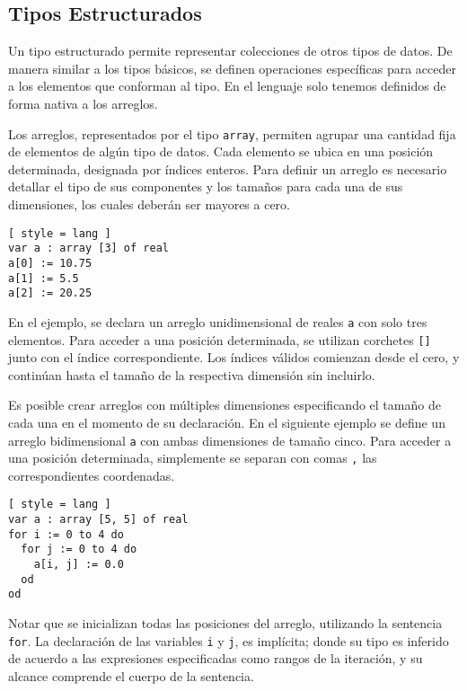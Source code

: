 \subsection{Tipos Estructurados}

Un tipo estructurado permite representar colecciones de otros tipos de datos.
De manera similar a los tipos básicos, se definen operaciones específicas para acceder a los elementos que conforman al tipo.
En el lenguaje solo tenemos definidos de forma nativa a los arreglos.

Los arreglos, representados por el tipo \lstinline[style = lang]{array}, permiten agrupar una cantidad fija de elementos de algún tipo de datos.
Cada elemento se ubica en una posición determinada, designada por índices enteros.
Para definir un arreglo es necesario detallar el tipo de sus componentes y los tamaños para cada una de sus dimensiones, los cuales deberán ser mayores a cero.

\begin{lstlisting}[ style = lang ]
var a : array [3] of real
a[0] := 10.75
a[1] := 5.5
a[2] := 20.25
\end{lstlisting}

En el ejemplo, se declara un arreglo unidimensional de reales \lstinline[style = lang]{a} con solo tres elementos.
Para acceder a una posición determinada, se utilizan corchetes \lstinline[style = lang]{[]} junto con el índice correspondiente.
Los índices válidos comienzan desde el cero, y continúan hasta el tamaño de la respectiva dimensión sin incluirlo.

Es posible crear arreglos con múltiples dimensiones especificando el tamaño de cada una en el momento de su declaración.
En el siguiente ejemplo se define un arreglo bidimensional \lstinline[style = lang]{a} con ambas dimensiones de tamaño cinco.
Para acceder a una posición determinada, simplemente se separan con comas \lstinline[style = lang]{,} las correspondientes coordenadas.

\begin{lstlisting}[ style = lang ]
var a : array [5, 5] of real
for i := 0 to 4 do
  for j := 0 to 4 do
    a[i, j] := 0.0
  od
od
\end{lstlisting}

Notar que se inicializan todas las posiciones del arreglo, utilizando la sentencia \lstinline[style = lang]{for}.
La declaración de las variables \lstinline[style = lang]{i} y \lstinline[style = lang]{j}, es implícita; donde su tipo es inferido de acuerdo a las expresiones especificadas como rangos de la iteración, y su alcance comprende el cuerpo de la sentencia.

